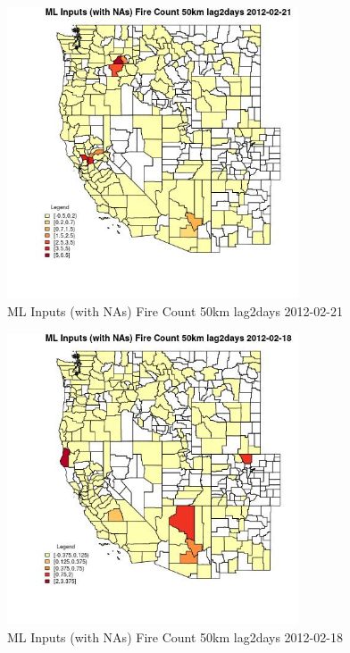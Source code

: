 \begin{figure} 
\centering  
\includegraphics[width=0.77\textwidth]{Code_Outputs/Report_ML_input_PM25_Step4_part_f_de_duplicated_aveswNAs_CountyFire_Count_50km_lag2daysMean2012-02-21.jpg} 
\caption{\label{fig:Report_ML_input_PM25_Step4_part_f_de_duplicated_aveswNAsCountyFire_Count_50km_lag2daysMean2012-02-21}ML Inputs (with NAs) Fire Count 50km lag2days 2012-02-21} 
\end{figure} 
 

\begin{figure} 
\centering  
\includegraphics[width=0.77\textwidth]{Code_Outputs/Report_ML_input_PM25_Step4_part_f_de_duplicated_aveswNAs_CountyFire_Count_50km_lag2daysMean2012-02-18.jpg} 
\caption{\label{fig:Report_ML_input_PM25_Step4_part_f_de_duplicated_aveswNAsCountyFire_Count_50km_lag2daysMean2012-02-18}ML Inputs (with NAs) Fire Count 50km lag2days 2012-02-18} 
\end{figure} 
 

